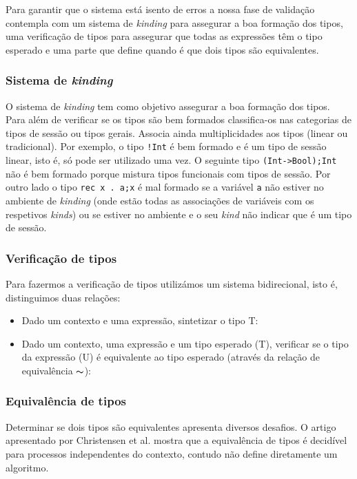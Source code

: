 Para garantir que o sistema está isento de erros a nossa fase de validação contempla com um sistema de \textit{kinding} para assegurar a boa formação dos tipos, uma verificação de tipos para assegurar que todas as expressões têm o tipo esperado e uma parte que define quando é que dois tipos são equivalentes.

\subsubsection{Sistema de \textit{kinding}}
O sistema de \textit{kinding} tem como objetivo assegurar a boa formação dos tipos. Para além de verificar se os tipos são bem formados classifica-os nas categorias de tipos de sessão ou tipos gerais. Associa ainda multiplicidades aos tipos (linear ou tradicional).
Por exemplo, o tipo \lstinline|!Int| é bem formado e é um tipo de sessão linear, isto é, só pode ser utilizado uma vez. O seguinte tipo \lstinline|(Int->Bool);Int| não é bem formado porque mistura tipos funcionais com tipos de sessão. Por outro lado o tipo \lstinline|rec x . a;x| é mal formado se a variável \lstinline|a| não estiver no ambiente de \textit{kinding} (onde estão todas as associações de variáveis com os respetivos \textit{kinds}) ou se estiver no ambiente e o seu \textit{kind} não indicar que é um tipo de sessão.

\subsubsection{Verificação de tipos}
Para fazermos a verificação de tipos utilizámos um sistema bidirecional, isto é, distinguimos duas relações:
\begin{itemize}
\item Dado um contexto e uma expressão, sintetizar o tipo T: 
\item Dado um contexto, uma expressão e um tipo esperado (T), verificar se o tipo da expressão (U) é equivalente ao tipo esperado (através da relação de equivalência $\thicksim$):%
    
\end{itemize}

\subsubsection{Equivalência de tipos}

Determinar se dois tipos são equivalentes apresenta diversos desafios. O artigo apresentado por Christensen et al. \cite{decidable-CFP-bisimilarity} mostra que a equivalência de tipos é decidível para processos independentes do contexto, contudo não define diretamente um algoritmo.

